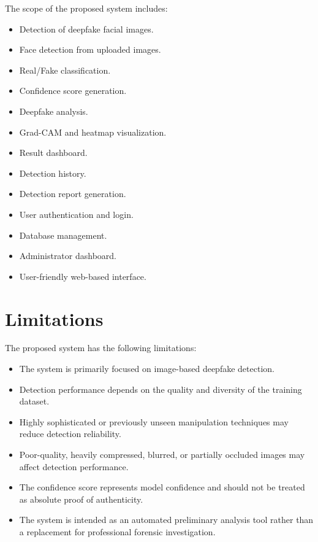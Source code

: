 \documentclass[12pt,a4paper,oneside]{report}
\begin{document}
The scope of the proposed system includes:

\begin{itemize}
    \item Detection of deepfake facial images.
    \item Face detection from uploaded images.
    \item Real/Fake classification.
    \item Confidence score generation.
    \item Deepfake analysis.
    \item Grad-CAM and heatmap visualization.
    \item Result dashboard.
    \item Detection history.
    \item Detection report generation.
    \item User authentication and login.
    \item Database management.
    \item Administrator dashboard.
    \item User-friendly web-based interface.
\end{itemize}

\section{Limitations}

The proposed system has the following limitations:

\begin{itemize}
    \item The system is primarily focused on image-based deepfake detection.
    \item Detection performance depends on the quality and diversity of the training dataset.
    \item Highly sophisticated or previously unseen manipulation techniques may reduce detection reliability.
    \item Poor-quality, heavily compressed, blurred, or partially occluded images may affect detection performance.
    \item The confidence score represents model confidence and should not be treated as absolute proof of authenticity.
    \item The system is intended as an automated preliminary analysis tool rather than a replacement for professional forensic investigation.
\end{itemize}
\end{document}

